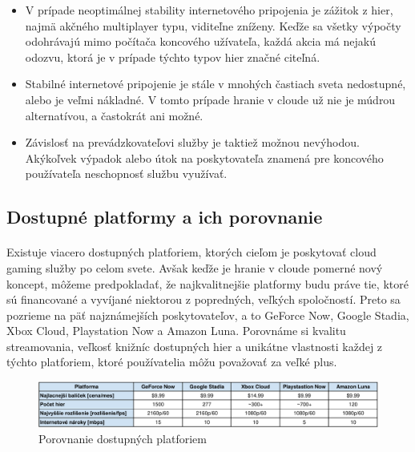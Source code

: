 \documentclass[10pt,twoside,slovak,a4paper]{article}
\begin{document}
\begin{itemize}

\item V prípade neoptimálnej stability internetového pripojenia je zážitok z hier, najmä akčného multiplayer typu, viditeľne zníženy. Keďže sa všetky výpočty odohrávajú mimo počítača koncového užívateľa, každá akcia má nejakú odozvu, ktorá je v prípade týchto typov hier značné citeľná.

\item Stabilné internetové pripojenie je stále v mnohých častiach sveta nedostupné, alebo je veľmi nákladné. V tomto prípade hranie v cloude už nie je múdrou alternatívou, a častokrát ani možné.

\item Závislosť na prevádzkovateľovi služby je taktiež možnou nevýhodou. Akýkoľvek výpadok alebo útok na poskytovateľa znamená pre koncového používateľa neschopnosť službu využívať.

\end{itemize}



\subsection{Dostupné platformy a ich porovnanie}

\paragraph{} Existuje viacero dostupných platforiem, ktorých cieľom je poskytovať cloud gaming služby po celom svete. Avšak keďže je hranie v cloude pomerné nový koncept, môžeme predpokladať, že najkvalitnejšie platformy budu práve tie, ktoré sú financované a vyvíjané niektorou z popredných, veľkých spoločností. Preto sa pozrieme na päť najznámejších poskytovateľov, a to GeForce Now, Google Stadia, Xbox Cloud, Playstation Now a Amazon Luna. Porovnáme si kvalitu streamovania, veľkosť knižníc dostupných hier a unikátne vlastnosti každej z týchto platforiem, ktoré používatelia môžu považovať za veľké plus. \cite{geforce-now}\cite{stadia}\cite{xbox-cloud}\cite{playstation-now}\cite{amazon-luna}

\begin{figure}[H]
	\includegraphics[width=1.0\textwidth]{cloud-gaming-tabulka-crop.pdf}
	\caption{Porovnanie dostupných platforiem \cite{geforce-now}\cite{stadia}\cite{xbox-cloud}\cite{playstation-now}\cite{amazon-luna}}
	\label{fig:comparison-table}
\end{figure}
\end{document}
